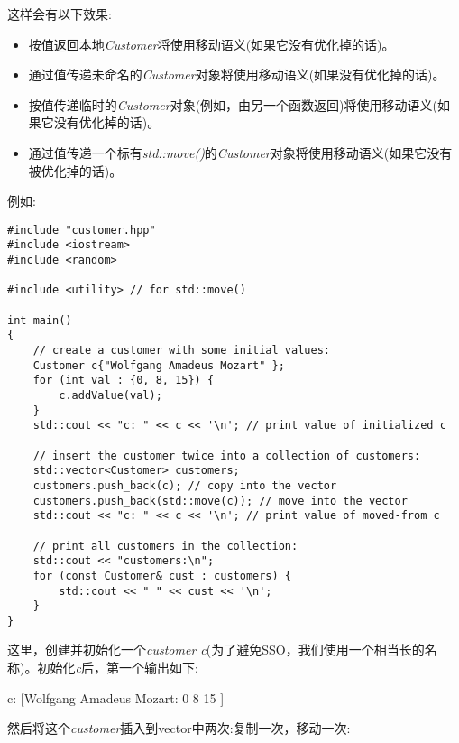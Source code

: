 这样会有以下效果:\par

\begin{itemize}
	\item 按值返回本地\textit{Customer}将使用移动语义(如果它没有优化掉的话)。
	\item 通过值传递未命名的\textit{Customer}对象将使用移动语义(如果没有优化掉的话)。
	\item 按值传递临时的\textit{Customer}对象(例如，由另一个函数返回)将使用移动语义(如果它没有优化掉的话)。
	\item 通过值传递一个标有\textit{std::move()}的\textit{Customer}对象将使用移动语义(如果它没有被优化掉的话)。
\end{itemize}

例如:\par

{\color{red}{basics/customer1.cpp}}

\begin{lstlisting}[caption={}]
#include "customer.hpp"
#include <iostream>
#include <random>

#include <utility> // for std::move()

int main()
{
	// create a customer with some initial values:
	Customer c{"Wolfgang Amadeus Mozart" };
	for (int val : {0, 8, 15}) {
		c.addValue(val);
	}
	std::cout << "c: " << c << '\n'; // print value of initialized c
	
	// insert the customer twice into a collection of customers:
	std::vector<Customer> customers;
	customers.push_back(c); // copy into the vector
	customers.push_back(std::move(c)); // move into the vector
	std::cout << "c: " << c << '\n'; // print value of moved-from c
	
	// print all customers in the collection:
	std::cout << "customers:\n";
	for (const Customer& cust : customers) {
		std::cout << " " << cust << '\n';
	}
}
\end{lstlisting}

这里，创建并初始化一个\textit{customer c}(为了避免SSO，我们使用一个相当长的名称)。初始化\textit{c}后，第一个输出如下:\par

\begin{tcolorbox}[colback=white,colframe=black]
c: [Wolfgang Amadeus Mozart: 0 8 15 ]
\end{tcolorbox}

然后将这个\textit{customer}插入到vector中两次:复制一次，移动一次:\par

